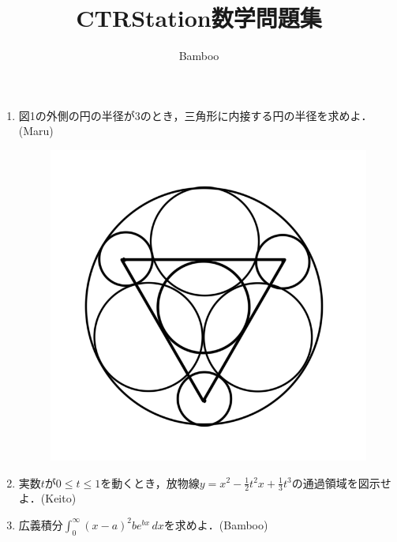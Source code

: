 \documentclass[a4j]{jsarticle}
\title{CTRStation数学問題集}
\author{Bamboo}
\begin{document}
\maketitle

\begin{enumerate}
  \setlength{\parskip}{4cm}
  \everymath{\displaystyle}

  \item 図1の外側の円の半径が3のとき，三角形に内接する円の半径を求めよ．(Maru)

  \begin{figure}[htbp]
  \centering
  \includegraphics[scale=0.3]{radius.png}
  \caption{}
  \end{figure}

  \item 実数$t$が$0\leq t\leq 1$を動くとき，放物線$y=x^2-\frac{1}{2}t^2x+\frac{1}{3}t^3$の通過領域を図示せよ．(Keito)
  
  \item 広義積分$\int_{0}^{∞}(x-a)^2be^{bx}\,dx$を求めよ．(Bamboo)

\end{enumerate}
\end{document}

